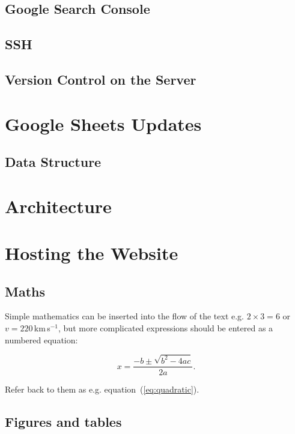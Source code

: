 \documentclass[fleqn,usenatbib]{mnras}
\begin{document}
\subsection{Google Search Console}

\subsection{SSH}

\subsection{Version Control on the Server}


\section{Google Sheets Updates}
\subsection{Data Structure}


\section{Architecture}



\section{Hosting the Website}






\subsection{Maths}
\label{sec:maths} %

Simple mathematics can be inserted into the flow of the text e.g. $2\times3=6$
or $v=220$\,km\,s$^{-1}$, but more complicated expressions should be entered
as a numbered equation:

\begin{equation}
    x=\frac{-b\pm\sqrt{b^2-4ac}}{2a}.
	\label{eq:quadratic}
\end{equation}

Refer back to them as e.g. equation~(\ref{eq:quadratic}).

\subsection{Figures and tables}
\end{document}
